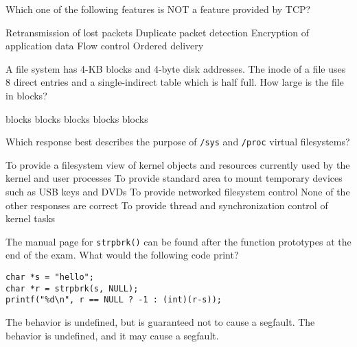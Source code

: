 \variant
 Which one of the following features is NOT a feature provided by TCP? 
\begin{answers}
\answer Retransmission of lost packets
\answer Duplicate packet detection
\correctanswer Encryption of application data
\answer Flow control
\answer Ordered delivery
\end{answers}
\begin{solution}
\end{solution}

\variant
 A file system has 4-KB blocks and 4-byte disk addresses. The inode of a file uses 8 direct entries and a single-indirect table which is half full.  How large is the file in blocks? 
\begin{answers}
 blocks
 blocks
 blocks
 blocks
 blocks
\end{answers}
\begin{solution}
\end{solution}

\variant
Which response best describes the purpose of {\tt /sys} and {\tt /proc} virtual filesystems?
\begin{answers}
\correctanswer To provide a filesystem view of kernel objects and resources currently used by the kernel and user processes
\answer To provide standard area to mount temporary devices such as USB keys and DVDs
\answer To provide networked filesystem control
\answer None of the other responses are correct
\answer To provide thread and synchronization control of kernel tasks
\end{answers}
\begin{solution}
\end{solution}


\variant
The manual page for {\tt strpbrk()} can be found after the function prototypes at
the end of the exam.    What would the following code print?
\begin{verbatim}
char *s = "hello";
char *r = strpbrk(s, NULL);
printf("%d\n", r == NULL ? -1 : (int)(r-s));
\end{verbatim}

\begin{answers}
\answer The behavior is undefined, but is guaranteed not to cause a segfault.
\correctanswer The behavior is undefined, and it may cause a segfault.
\end{answers}
\begin{solution}
\end{solution}


